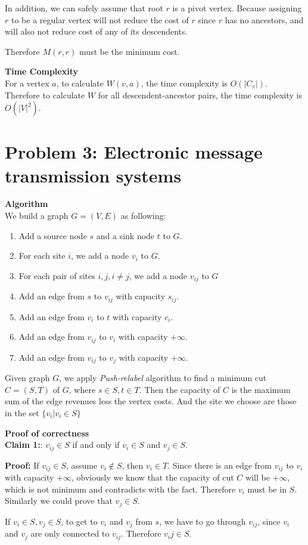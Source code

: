 \documentclass{article}
\newcommand{\Complexity}{\vspace{0.3cm} \noindent\textbf{Time Complexity} \vspace{0.2cm} \\}
\newcommand{\Proof}{\vspace{0.3cm} \noindent\textbf{Proof of correctness} \vspace{0.2cm} \\}
\newcommand{\Algorithm}{\textbf{Algorithm} \vspace{0.2cm}\\}
\begin{document}
In addition, we can safely assume that root $r$ is a pivot vertex. Because assigning $r$ to be a
regular vertex will not reduce the cost of $r$ since $r$ has no ancestors, and will also not reduce
cost of any of its descendents. 

Therefore $M(r, r)$ must be the minimum cost.  

\Complexity
For a vertex $a$, to calculate $W(v, a)$, the time complexity is $O(|C_v|)$. Therefore to calculate
$W$ for all  descendent-ancestor pairs, the time complexity is $O(|V|^2)$.


\section*{Problem 3: Electronic message transmission systems}
\Algorithm
We build a graph $G = (V, E)$ as following:
\begin{enumerate}
  \item Add a source node $s$ and a sink node $t$ to $G$.
  \item For each site $i$, we add a node $v_i$ to $G$.
  \item For each pair of sites $i, j, i\neq j$, we add a node $v_{ij}$ to $G$
  \item Add an edge from $s$ to $v_{ij}$ with capacity $s_{ij}$.
  \item Add an edge from $v_i$ to $t$ with capacity $c_i$.
  \item Add an edge from $v_{ij}$ to $v_i$ with capacity $+\infty$.
  \item Add an edge from $v_{ij}$ to $v_j$ with capacity $+\infty$.
\end{enumerate}

Given graph $G$, we apply \textit{Push-relabel} algorithm to find a minimum cut $C = (S, T)$ of $G$,
where $s \in S, t \in T$. Then the capacity of $C$ is the maximum sum of the edge
revenues less the vertex costs. And the site we choose are those in the set $\{v_i | v_i \in S\}$ 

\Proof
\textbf{Claim 1:}: $v_{ij} \in S$ if and only if $v_i \in S$ and $v_j \in S$.

\textbf{Proof:} If $v_{ij} \in S$, assume $v_i \not\in S$, then $v_i \in T$. Since there is an edge
from $v_{ij}$ to $v_i$ with capacity $+\infty$, obviously we know that the capacity of cut $C$ will
be $+\infty$, which is not minimum and contradicts with the fact. Therefore $v_i$ must be in $S$.
Similarly we could prove that $v_j \in S$.

If $v_i \in S, v_j \in S$, to get to $v_i$ and $v_j$ from $s$, we have to go through $v_{ij}$, since
$v_i$ and $v_j$ are only connected to $v_{ij}$. Therefore $v_ij \in S$.
\end{document}
